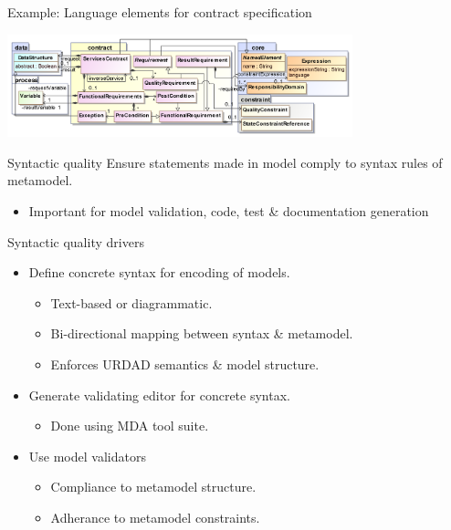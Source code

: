 
\begin{frame}{Example: Language elements for contract specification}

  \includegraphics[width=100mm]{contract}

\end{frame}



\begin{frame}{Syntactic quality}
   Ensure statements made in model comply to syntax rules of metamodel.
		\begin{itemize} 
			 \item Important for model validation, code, test \& documentation generation
		  \end{itemize}
  \pause
  \begin{block}{Syntactic quality drivers}
    \begin{itemize}
		  \item<+-| alert@+> Define concrete syntax for encoding of models.
			 \begin{itemize}
				\item Text-based or diagrammatic.
				\item Bi-directional mapping between syntax \& metamodel.
				\item Enforces URDAD semantics \& model structure.
			 \end{itemize}
		  \item<+-| alert@+> Generate validating editor for concrete syntax.
			 \begin{itemize}
				\item Done using MDA tool suite.
			 \end{itemize}
		  \item<+-| alert@+> Use model validators
			 \begin{itemize}
				\item Compliance to metamodel structure.
				\item Adherance to metamodel constraints.
			 \end{itemize}
    \end{itemize}
  \end{block}

\end{frame}

